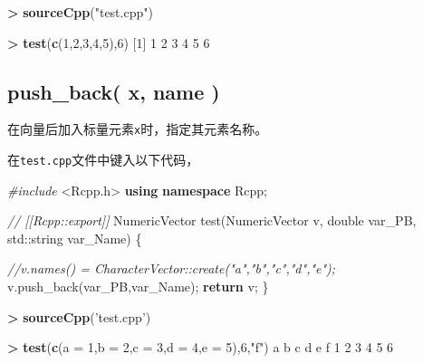 \documentclass[]{ctexbook}
\newenvironment{Shaded}{\begin{snugshade}}{\end{snugshade}}
\newcommand{\KeywordTok}[1]{\textcolor[rgb]{0.13,0.29,0.53}{\textbf{#1}}}
\newcommand{\DataTypeTok}[1]{\textcolor[rgb]{0.13,0.29,0.53}{#1}}
\newcommand{\DecValTok}[1]{\textcolor[rgb]{0.00,0.00,0.81}{#1}}
\newcommand{\StringTok}[1]{\textcolor[rgb]{0.31,0.60,0.02}{#1}}
\newcommand{\ImportTok}[1]{#1}
\newcommand{\CommentTok}[1]{\textcolor[rgb]{0.56,0.35,0.01}{\textit{#1}}}
\newcommand{\ControlFlowTok}[1]{\textcolor[rgb]{0.13,0.29,0.53}{\textbf{#1}}}
\newcommand{\OperatorTok}[1]{\textcolor[rgb]{0.81,0.36,0.00}{\textbf{#1}}}
\newcommand{\BuiltInTok}[1]{#1}
\newcommand{\PreprocessorTok}[1]{\textcolor[rgb]{0.56,0.35,0.01}{\textit{#1}}}
\newcommand{\NormalTok}[1]{#1}
\begin{document}
\begin{Shaded}
\begin{Highlighting}[]
\OperatorTok{>}\StringTok{ }\KeywordTok{sourceCpp}\NormalTok{(}\StringTok{"test.cpp"}\NormalTok{)}

\OperatorTok{>}\StringTok{ }\KeywordTok{test}\NormalTok{(}\KeywordTok{c}\NormalTok{(}\DecValTok{1}\NormalTok{,}\DecValTok{2}\NormalTok{,}\DecValTok{3}\NormalTok{,}\DecValTok{4}\NormalTok{,}\DecValTok{5}\NormalTok{),}\DecValTok{6}\NormalTok{)}
\NormalTok{[}\DecValTok{1}\NormalTok{] }\DecValTok{1} \DecValTok{2} \DecValTok{3} \DecValTok{4} \DecValTok{5} \DecValTok{6}
\end{Highlighting}
\end{Shaded}

\subsection{push\_back( x, name )}\label{push-back-name}

在向量后加入标量元素\texttt{x}时，指定其元素名称。

在\texttt{test.cpp}文件中键入以下代码，

\begin{Shaded}
\begin{Highlighting}[]
\PreprocessorTok{#include }\ImportTok{<Rcpp.h>}
\KeywordTok{using} \KeywordTok{namespace}\NormalTok{ Rcpp;}

\CommentTok{// [[Rcpp::export]]}
\NormalTok{NumericVector test(NumericVector v, }
                   \DataTypeTok{double}\NormalTok{ var_PB, }
                   \BuiltInTok{std::}\NormalTok{string var_Name) \{}
  
  \CommentTok{//v.names() = CharacterVector::create("a","b","c","d","e");}
\NormalTok{  v.push_back(var_PB,var_Name);}
  \ControlFlowTok{return}\NormalTok{ v;}
\NormalTok{\}}
\end{Highlighting}
\end{Shaded}

\begin{Shaded}
\begin{Highlighting}[]
\OperatorTok{>}\StringTok{ }\KeywordTok{sourceCpp}\NormalTok{(}\StringTok{'test.cpp'}\NormalTok{)}

\OperatorTok{>}\StringTok{ }\KeywordTok{test}\NormalTok{(}\KeywordTok{c}\NormalTok{(}\DataTypeTok{a =} \DecValTok{1}\NormalTok{,}\DataTypeTok{b =} \DecValTok{2}\NormalTok{,}\DataTypeTok{c =} \DecValTok{3}\NormalTok{,}\DataTypeTok{d =} \DecValTok{4}\NormalTok{,}\DataTypeTok{e =} \DecValTok{5}\NormalTok{),}\DecValTok{6}\NormalTok{,}\StringTok{"f"}\NormalTok{)}
\NormalTok{a b c d e f}
\DecValTok{1} \DecValTok{2} \DecValTok{3} \DecValTok{4} \DecValTok{5} \DecValTok{6}
\end{Highlighting}
\end{Shaded}
\end{document}
